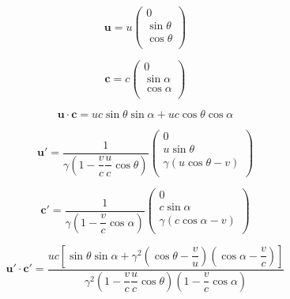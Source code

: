 \begin{equation}
	\mathbf{u} = u
	\begin{pmatrix}
		0          \\
		\sin\theta \\
		\cos\theta \\
	\end{pmatrix}
\end{equation}

\begin{equation}
	\mathbf{c} = c
	\begin{pmatrix}
		0          \\
		\sin\alpha \\
		\cos\alpha \\
	\end{pmatrix}
\end{equation}

\begin{equation}
	\mathbf{u} \cdot \mathbf{c} = uc  \sin\theta\sin\alpha + uc \cos\theta\cos\alpha
\end{equation}

\begin{equation}
	\mathbf{u}' = \dfrac{1}{\gamma \left(1-\dfrac{v}{c}\dfrac{u}{c}\cos\theta \right)}
	\begin{pmatrix}
		0                \\
		u \sin\theta       \\
		\gamma (u \cos\theta - v) \\
	\end{pmatrix}
\end{equation}

\begin{equation}
	\mathbf{c}' = \dfrac{1}{\gamma \left(1-\dfrac{v}{c}\cos\alpha \right)}
	\begin{pmatrix}
		0                \\
		c \sin\alpha       \\
		\gamma (c\cos\alpha - v) \\
	\end{pmatrix}
\end{equation}

\begin{equation}
	\mathbf{u}' \cdot \mathbf{c}' = \dfrac{ uc \left[ \sin\theta\sin\alpha + \gamma^2\left(\cos\theta - \dfrac{v}{u}\right)\left( \cos\alpha - \dfrac{v}{c} \right) \right]}{ \gamma^2 \left(1-\dfrac{v}{c}\dfrac{u}{c}\cos\theta \right) \left(1-\dfrac{v}{c}\cos\alpha \right)}
\end{equation}

